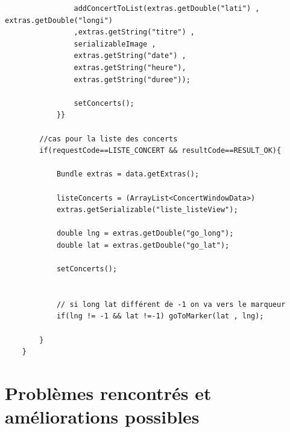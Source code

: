 \documentclass{article}
\begin{document}
\begin{itemize}
\begin{verbatim}
                addConcertToList(extras.getDouble("lati") , extras.getDouble("longi")
                ,extras.getString("titre") ,
                serializableImage , 
                extras.getString("date") ,
                extras.getString("heure"), 
                extras.getString("duree"));

                setConcerts();
			}}

		//cas pour la liste des concerts 
        if(requestCode==LISTE_CONCERT && resultCode==RESULT_OK){

            Bundle extras = data.getExtras();

            listeConcerts = (ArrayList<ConcertWindowData>)
            extras.getSerializable("liste_listeView");
            
            double lng = extras.getDouble("go_long");
            double lat = extras.getDouble("go_lat");

            setConcerts();


			// si long lat différent de -1 on va vers le marqueur
            if(lng != -1 && lat !=-1) goToMarker(lat , lng);

        }
    }
\end{verbatim}
\end{itemize}

\section{Problèmes rencontrés et améliorations possibles}
\end{document}
